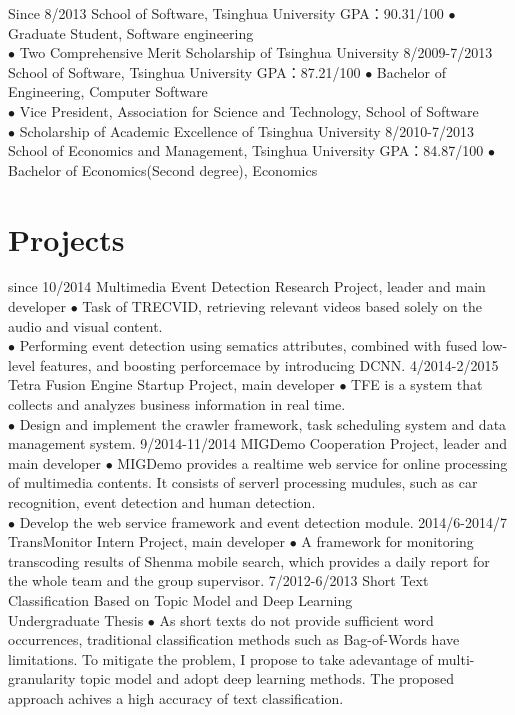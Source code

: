 \documentclass[]{friggeri-cv}
\begin{document}
\begin{entrylist}
  \entry
    {Since 8/2013}
    {School of Software, Tsinghua University}
    {GPA：90.31/100}
    {$\bullet$ Graduate Student, Software engineering \\
    $\bullet$ Two Comprehensive Merit Scholarship of Tsinghua University
    }
  \entry
    {8/2009-7/2013}
    {School of Software, Tsinghua University}
    {GPA：87.21/100}
    {$\bullet$ Bachelor of Engineering, Computer Software \\
    $\bullet$ Vice President, Association for Science and Technology, School of Software\\
    $\bullet$ Scholarship of Academic Excellence of Tsinghua University 
    }
  \entry
    {8/2010-7/2013}
    {School of Economics and Management, Tsinghua University}
    {GPA：84.87/100}
    {$\bullet$ Bachelor of Economics(Second degree), Economics}
\end{entrylist}

\section{Projects}

\begin{entrylist}
  \entry
    {since 10/2014}
    {Multimedia Event Detection}
    {Research Project, leader and main developer}
    {$\bullet$ Task of TRECVID, retrieving relevant videos based solely on the audio and visual content. \\
    $\bullet$ Performing event detection using sematics attributes, combined with fused low-level features, and boosting perforcemace by introducing DCNN.}
  \entry
    {4/2014-2/2015}
    {Tetra Fusion Engine}
    {Startup Project, main developer}
    {$\bullet$ TFE is a system that collects and analyzes business information in real time. \\
    $\bullet$ Design and implement the crawler framework, task scheduling system and data management system.}
  \entry
    {9/2014-11/2014}
    {MIGDemo}
    {Cooperation Project, leader and main developer}
    {$\bullet$ MIGDemo provides a realtime web service for online processing of multimedia contents. It consists of serverl processing mudules, such as car recognition, event detection and human detection.\\
    $\bullet$ Develop the web service framework and event detection module.}
  \entry
    {2014/6-2014/7}
    {TransMonitor}
    {Intern Project, main developer}
    {$\bullet$ A framework for monitoring transcoding results of Shenma mobile search, which provides a daily report for the whole team and the group supervisor.}
  \entry
    {7/2012-6/2013}
    {Short Text Classification Based on Topic Model and Deep Learning \\ }
    {Undergraduate Thesis}
    {$\bullet$ As short texts do not provide sufficient word occurrences, traditional classification methods such as Bag-of-Words have limitations. 
    To mitigate the problem, I propose to take adevantage of multi-granularity topic model and adopt deep learning methods. The proposed approach achives a high accuracy of text classification.}
\end{entrylist}
\end{document}
